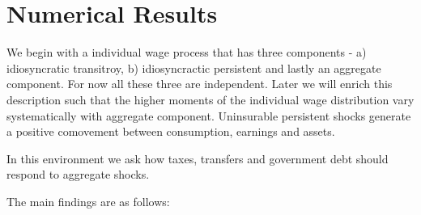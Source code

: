 \documentclass[thmsb,11pt]{article}
\begin{document}




\section{Numerical Results}
We begin with  a individual wage process that has three components - a) idiosyncratic transitroy, b) idiosyncractic persistent and lastly an aggregate component. For now all these three are independent. Later we will enrich this description such that the higher moments of the individual wage distribution vary systematically with aggregate component.
Uninsurable persistent shocks  generate a positive comovement between consumption, earnings and assets. 

In this environment we ask how taxes, transfers and government debt should respond to aggregate shocks.

The main findings are as follows:
\end{document}
